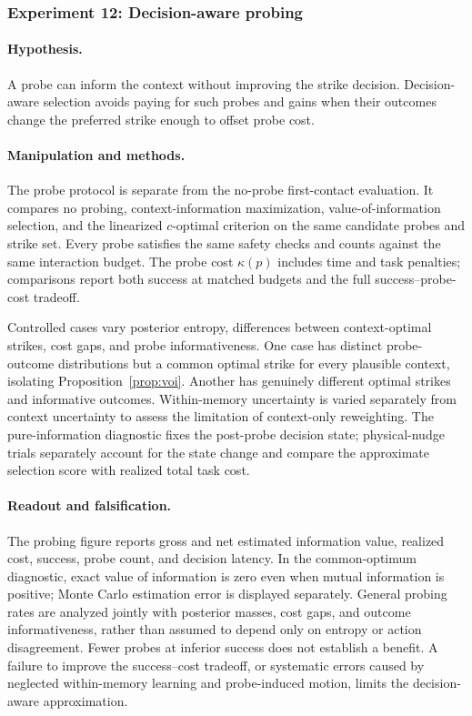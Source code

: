 \subsubsection{Experiment 12: Decision-aware probing}
\paragraph{Hypothesis.}
A probe can inform the context without improving the strike decision. Decision-aware selection avoids paying for such probes and gains when their outcomes change the preferred strike enough to offset probe cost.

\paragraph{Manipulation and methods.}
The probe protocol is separate from the no-probe first-contact evaluation. It compares no probing, context-information maximization, value-of-information selection, and the linearized $c$-optimal criterion on the same candidate probes and strike set. Every probe satisfies the same safety checks and counts against the same interaction budget. The probe cost $\kappa(p)$ includes time and task penalties; comparisons report both success at matched budgets and the full success--probe-cost tradeoff.

Controlled cases vary posterior entropy, differences between context-optimal strikes, cost gaps, and probe informativeness. One case has distinct probe-outcome distributions but a common optimal strike for every plausible context, isolating Proposition~\ref{prop:voi}. Another has genuinely different optimal strikes and informative outcomes. Within-memory uncertainty is varied separately from context uncertainty to assess the limitation of context-only reweighting. The pure-information diagnostic fixes the post-probe decision state; physical-nudge trials separately account for the state change and compare the approximate selection score with realized total task cost.

\paragraph{Readout and falsification.}
The probing figure reports gross and net estimated information value, realized cost, success, probe count, and decision latency. In the common-optimum diagnostic, exact value of information is zero even when mutual information is positive; Monte Carlo estimation error is displayed separately. General probing rates are analyzed jointly with posterior masses, cost gaps, and outcome informativeness, rather than assumed to depend only on entropy or action disagreement. Fewer probes at inferior success does not establish a benefit. A failure to improve the success--cost tradeoff, or systematic errors caused by neglected within-memory learning and probe-induced motion, limits the decision-aware approximation.
